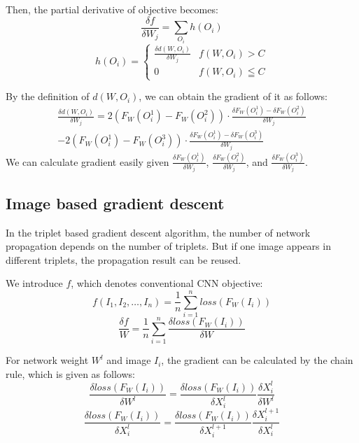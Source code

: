 Then, the partial derivative of objective becomes:
\begin{equation}
	\frac{\delta f}{\delta W_j} = \sum_{O_i} h(O_i)
\end{equation}
\begin{equation}
	h(O_i) = 
	\begin{cases}
		\frac{ \delta d(W, O_i) }{ \delta W_j } & f(W, O_i) > C \\
		0										& f(W, O_i) \leqq C
	\end{cases}
\end{equation}

By the definition of $d(W, O_i)$, we can obtain the gradient of it as follows:
\begin{equation}
\begin{split}
	\frac{ \delta d(W, O_i) }{ \delta W_j } =
		2 (F_W(O_i^1) - F_W(O_i^2)) \cdot \frac{ \delta F_W(O_i^1) - \delta F_W(O_i^2) }{ \delta W_j }
		\\ -
		2 (F_W(O_i^1) - F_W(O_i^3)) \cdot \frac{ \delta F_W(O_i^1) - \delta F_W(O_i^3) }{ \delta W_j }
\end{split}
\end{equation}
We can calculate gradient easily given $\frac{\delta F_W(O_i^1)}{\delta W_j}$, $\frac{\delta F_W(O_i^2)}{\delta W_j}$,
and $\frac{\delta F_W(O_i^3)}{\delta W_j}$.

\subsection{Image based gradient descent}
In the triplet based gradient descent algorithm, the number of network propagation depends on the number
of triplets. But if one image appears in different triplets, the propagation result can be reused.

We introduce $f$, which denotes conventional CNN objective:
\begin{equation}
	f(I_1, I_2, \dots, I_n) = \frac{1}{n} \sum_{i=1}^{n} loss(F_W(I_i))
\end{equation}
\begin{equation}
	\frac{\delta f}{W} = \frac{1}{n} \sum_{i=1}^{n} \frac{\delta loss(F_W(I_i))}{\delta W}
\end{equation}

For network weight $W^l$ and image $I_i$, the gradient can be calculated by the chain rule, which is given
as follows:
\begin{equation}
	\frac{\delta loss(F_W(I_i))}{\delta W^l} = \frac{\delta loss(F_W(I_i))}{\delta X_i^l}
		\frac{\delta X_i^l}{\delta W^l}
\end{equation}
\begin{equation}
	\frac{\delta loss(F_W(I_i))}{\delta X_i^l} = \frac{\delta loss(F_W(I_i))}{ \delta X_i^{l+1} }
		\frac{ \delta X_i^{l+1} }{ \delta X_i^l }
\end{equation}

